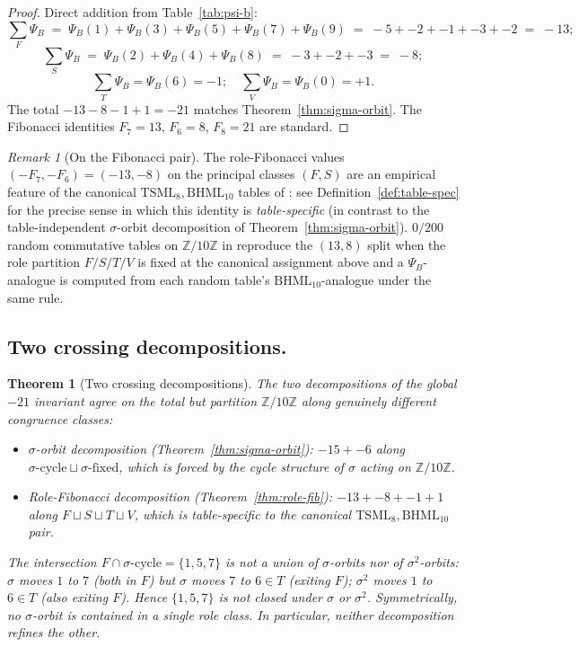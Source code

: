 \documentclass[11pt,reqno]{amsart}
\theoremstyle{plain}
\newtheorem{theorem}{Theorem}[section]
\theoremstyle{definition}
\theoremstyle{remark}
\newtheorem*{remark}{Remark}
\newcommand{\Z}{\mathbb{Z}}
\newcommand{\TS}{\mathrm{TSML}}
\newcommand{\BH}{\mathrm{BHML}}
\newcommand{\sig}{\sigma}
\begin{document}
\begin{proof}
Direct addition from Table~\ref{tab:psi-b}:
\[
\sum_F \Psi_B
\;=\; \Psi_B(1) + \Psi_B(3) + \Psi_B(5) + \Psi_B(7) + \Psi_B(9)
\;=\; -5 + -2 + -1 + -3 + -2 \;=\; -13;
\]
\[
\sum_S \Psi_B
\;=\; \Psi_B(2) + \Psi_B(4) + \Psi_B(8)
\;=\; -3 + -2 + -3 \;=\; -8;
\]
\[
\sum_T \Psi_B = \Psi_B(6) = -1;
\quad
\sum_V \Psi_B = \Psi_B(0) = +1.
\]
The total $-13 - 8 - 1 + 1 = -21$ matches Theorem~\ref{thm:sigma-orbit}.
The Fibonacci identities $F_7 = 13$, $F_6 = 8$, $F_8 = 21$ are
standard.
\end{proof}

\begin{remark}[On the Fibonacci pair]
The role-Fibonacci values $(-F_7, -F_6) = (-13, -8)$ on the principal
classes $(F, S)$ are an empirical feature of the canonical
$\TS_{8}, \BH_{10}$ tables of \cite{SandersGishFourCore}: see
Definition~\ref{def:table-spec} for the precise sense in which this
identity is \emph{table-specific} (in contrast to the
table-independent $\sig$-orbit decomposition of
Theorem~\ref{thm:sigma-orbit}).
$0/200$ random commutative tables on $\Z/10\Z$ in
\cite[N8]{SandersBridgeWP9} reproduce the $(13, 8)$ split when the
role partition $F/S/T/V$ is fixed at the canonical assignment
above and a $\Psi_B$-analogue is computed from each random table's
$\BH_{10}$-analogue under the same rule.
\end{remark}

\subsection{Two crossing decompositions.}
\begin{theorem}[Two crossing decompositions]\label{thm:cross}
The two decompositions of the global $-21$ invariant agree on the total
but partition $\Z/10\Z$ along genuinely different congruence classes:
\begin{itemize}
\item $\sig$-orbit decomposition (Theorem~\ref{thm:sigma-orbit}):
$-15 + -6$ along $\sig\text{-cycle} \sqcup \sig\text{-fixed}$,
which is forced by the cycle structure of $\sig$ acting on $\Z/10\Z$.
\item Role-Fibonacci decomposition (Theorem~\ref{thm:role-fib}):
$-13 + -8 + -1 + 1$ along $F \sqcup S \sqcup T \sqcup V$,
which is table-specific to the canonical $\TS_{8}, \BH_{10}$ pair.
\end{itemize}
The intersection $F \cap \sig\text{-cycle} = \{1, 5, 7\}$ is not a
union of $\sig$-orbits nor of $\sig^{2}$-orbits: $\sig$ moves $1$ to
$7$ (both in $F$) but $\sig$ moves $7$ to $6 \in T$ (exiting $F$);
$\sig^{2}$ moves $1$ to $6 \in T$ (also exiting $F$).
Hence $\{1, 5, 7\}$ is not closed under $\sig$ or $\sig^{2}$.
Symmetrically, no $\sig$-orbit is contained in a single role class.
In particular, neither decomposition refines the other.
\end{theorem}
\end{document}
